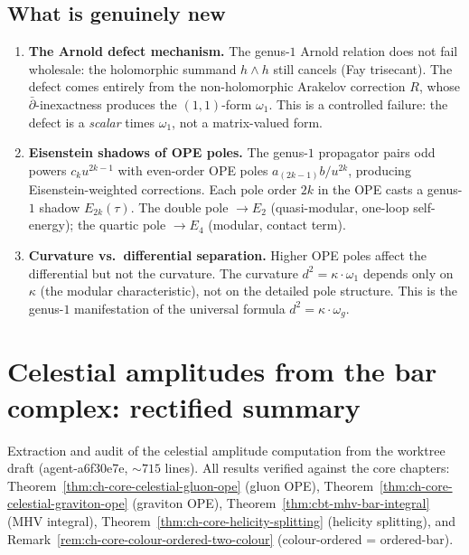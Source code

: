 \documentclass[11pt]{article}
\begin{document}
\subsection*{What is genuinely new}

\begin{enumerate}
\item \textbf{The Arnold defect mechanism.}  The genus-$1$ Arnold
  relation does not fail wholesale: the holomorphic summand
  $h\wedge h$ still cancels (Fay trisecant).  The defect comes
  entirely from the non-holomorphic Arakelov correction $R$,
  whose $\bar\partial$-inexactness produces the $(1,1)$-form
  $\omega_1$.  This is a controlled failure: the defect is a
  \emph{scalar} times $\omega_1$, not a matrix-valued form.
\item \textbf{Eisenstein shadows of OPE poles.}  The genus-$1$
  propagator pairs odd powers $c_k u^{2k-1}$ with even-order OPE
  poles $a_{(2k-1)}b/u^{2k}$, producing Eisenstein-weighted
  corrections.  Each pole order $2k$ in the OPE casts a genus-$1$
  shadow $E_{2k}(\tau)$.  The double pole $\to E_2$ (quasi-modular,
  one-loop self-energy); the quartic pole $\to E_4$ (modular,
  contact term).
\item \textbf{Curvature vs.\ differential separation.}  Higher
  OPE poles affect the differential but not the curvature.  The
  curvature $d^2 = \kappa\cdot\omega_1$ depends only on $\kappa$
  (the modular characteristic), not on the detailed pole structure.
  This is the genus-$1$ manifestation of the universal
  formula $d^2 = \kappa\cdot\omega_g$.
\end{enumerate}



\section{Celestial amplitudes from the bar complex: rectified summary}
\label{sec:celestial-bar-rectified}

Extraction and audit of the celestial amplitude computation from the
worktree draft (agent-a6f30e7e, ${\sim}715$ lines).  All results verified
against the core chapters: Theorem~\ref{thm:ch-core-celestial-gluon-ope}
(gluon OPE), Theorem~\ref{thm:ch-core-celestial-graviton-ope} (graviton
OPE), Theorem~\ref{thm:cbt-mhv-bar-integral} (MHV integral),
Theorem~\ref{thm:ch-core-helicity-splitting} (helicity splitting), and
Remark~\ref{rem:ch-core-colour-ordered-two-colour} (colour-ordered =
ordered-bar).
\end{document}
